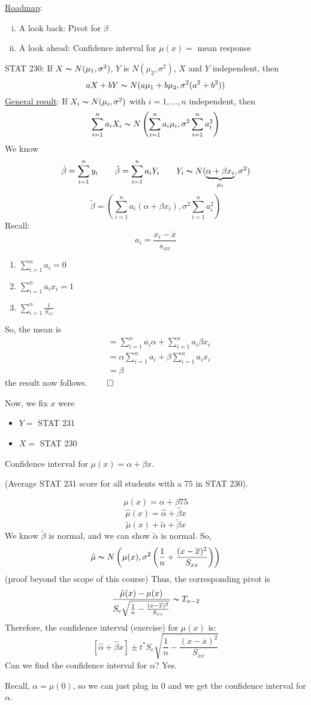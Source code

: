 \underline{Roadmap}:
\begin{enumerate}[(i)]
    \item A look back: Pivot for $ \beta $
    \item A look ahead: Confidence interval for $ \mu(x)= $ mean response
\end{enumerate}
STAT 230: If $ X \thicksim N(\mu_1, \sigma^2) $, $ Y $ is $ N(\mu_2,\sigma^2) $,
$ X $ and $ Y $ independent, then
\[ aX+bY \thicksim N(a\mu_1+b\mu_2,\sigma^2(a^2+b^2)) \]
\underline{General result}: If $ X_i \thicksim N(\mu_i,\sigma^2) $
with $ i=1,\ldots ,n $ independent, then
\[ \sum\limits_{i=1}^{n} a_iX_i \thicksim N\left(\sum\limits_{i=1}^{n} a_i\mu_i,
    \sigma^2 \sum\limits_{i=1}^{n} a_i^2\right) \]
We know
\[ \hat{\beta}=\sum\limits_{i=1}^{n} y_i\qquad
    \tilde{\beta}=\sum\limits_{i=1}^{n} a_iY_i\qquad
    Y_i \thicksim N(\underbrace{\alpha+\beta x_i}_{\mu_i},\sigma^2) \]
\[ \tilde{\beta}=\left( \sum\limits_{i=1}^{n} a_i(\alpha+\beta x_i),
    \sigma^2 \sum\limits_{i=1}^{n} a_i^2 \right) \]
Recall:
\[ a_i=\frac{x_i-\overline{x}}{s_{xx}}  \]
\begin{enumerate}
    \item $ \sum\limits_{i=1}^{n} a_i=0 $
    \item $ \sum\limits_{i=1}^{n} a_ix_i=1 $
    \item $ \sum\limits_{i=1}^{n} \frac{1}{S_{xx}} $
\end{enumerate}
So, the mean is
\begin{align*}
     & =\sum\limits_{i=1}^{n} a_i\alpha+\sum\limits_{i=1}^{n} a_i\beta x_i     \\
     & =\alpha \sum\limits_{i=1}^{n} a_i + \beta \sum\limits_{i=1}^{n} a_i x_i \\
     & =\beta
\end{align*}
the result now follows.
$ \qed $

Now, we fix $ x $ were
\begin{itemize}
    \item $ Y= $ STAT 231
    \item $ X= $ STAT 230
\end{itemize}
Confidence interval for $ \mu(x)=\alpha+\beta x $.

(Average STAT 231 score for all students with a $ 75 $ in STAT 230).

\[ \mu(x)=\alpha+\beta 75 \]
\[ \hat{\mu}(x)=\hat{\alpha}+\hat{\beta}x \]
\[ \tilde{\mu}(x)+\tilde{\alpha}+\tilde{\beta}x \]
We know $ \tilde{\beta} $ is normal, and we can show $ \tilde{\alpha} $ is normal.
So,
\[ \tilde{\mu} \thicksim N \left( \mu(x),\sigma^2
    \left( \frac{1}{n} +\frac{(x-\overline{x})^2}{S_{xx}} \right) \right) \]
(proof beyond the scope of this course)
Thus, the corresponding pivot is
\[ \frac{\tilde{\mu}(x)-\mu(x)}{S_{e}\sqrt{\frac{1}{n}-\frac{(x-\overline{x})^2}{S_{xx}}}}
    \thicksim T_{n-2} \]
Therefore, the confidence interval (exercise) for $ \mu(x) $ is:
\[ \left[ \hat{\alpha}+\hat{\beta}x \right]
    \pm
    t^* S_e \sqrt{\frac{1}{n}-\frac{(x-\overline{x})^2}{S_{xx}}} \]
Can we find the confidence interval for $ \alpha $? Yes.

Recall, $ \alpha=\mu(0) $, so we can just plug in $ 0 $ and we get the confidence
interval for $ \alpha $.
